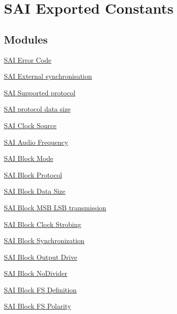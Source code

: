 \hypertarget{group___s_a_i___exported___constants}{}\section{S\+AI Exported Constants}
\label{group___s_a_i___exported___constants}
\subsection*{Modules}
\begin{DoxyCompactItemize}
\item 
\hyperlink{group___s_a_i___error___code}{S\+A\+I Error Code}
\item 
\hyperlink{group___s_a_i___block___sync_ext}{S\+A\+I External synchronisation}
\item 
\hyperlink{group___s_a_i___protocol}{S\+A\+I Supported protocol}
\item 
\hyperlink{group___s_a_i___protocol___data_size}{S\+A\+I protocol data size}
\item 
\hyperlink{group___s_a_i___clock___source}{S\+A\+I Clock Source}
\item 
\hyperlink{group___s_a_i___audio___frequency}{S\+A\+I Audio Frequency}
\item 
\hyperlink{group___s_a_i___block___mode}{S\+A\+I Block Mode}
\item 
\hyperlink{group___s_a_i___block___protocol}{S\+A\+I Block Protocol}
\item 
\hyperlink{group___s_a_i___block___data___size}{S\+A\+I Block Data Size}
\item 
\hyperlink{group___s_a_i___block___m_s_b___l_s_b__transmission}{S\+A\+I Block M\+S\+B L\+S\+B transmission}
\item 
\hyperlink{group___s_a_i___block___clock___strobing}{S\+A\+I Block Clock Strobing}
\item 
\hyperlink{group___s_a_i___block___synchronization}{S\+A\+I Block Synchronization}
\item 
\hyperlink{group___s_a_i___block___output___drive}{S\+A\+I Block Output Drive}
\item 
\hyperlink{group___s_a_i___block___no_divider}{S\+A\+I Block No\+Divider}
\item 
\hyperlink{group___s_a_i___block___f_s___definition}{S\+A\+I Block F\+S Definition}
\item 
\hyperlink{group___s_a_i___block___f_s___polarity}{S\+A\+I Block F\+S Polarity}
\item 

\end{DoxyCompactItemize}
